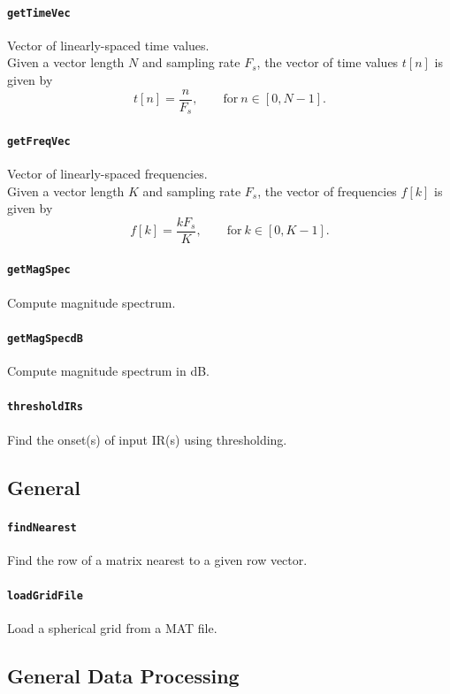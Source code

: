 \documentclass[11pt, oneside]{article}
\newcommand{\function}[1]{\paragraph*{\texttt{#1}}}
\begin{document}
\function{getTimeVec} Vector of linearly-spaced time values. \\
Given a vector length $N$ and sampling rate $F_s$, the vector of time values $t[n]$ is given by
\begin{equation}
t[n] = \frac{n}{F_s}, \quad\quad \text{for} ~ n \in [0, N-1].
\end{equation}

\function{getFreqVec} Vector of linearly-spaced frequencies. \\
Given a vector length $K$ and sampling rate $F_s$, the vector of frequencies $f[k]$ is given by
\begin{equation}
f[k] = \frac{k F_s}{K}, \quad\quad \text{for} ~ k \in [0, K-1].
\end{equation}

\function{getMagSpec} Compute magnitude spectrum. \\

\function{getMagSpecdB} Compute magnitude spectrum in dB. \\

\function{thresholdIRs} Find the onset(s) of input IR(s) using thresholding. \\


%

\subsection{General}

\function{findNearest} Find the row of a matrix nearest to a given row vector. \\

\function{loadGridFile} Load a spherical grid from a MAT file. \\

\subsection{General Data Processing}
\end{document}
